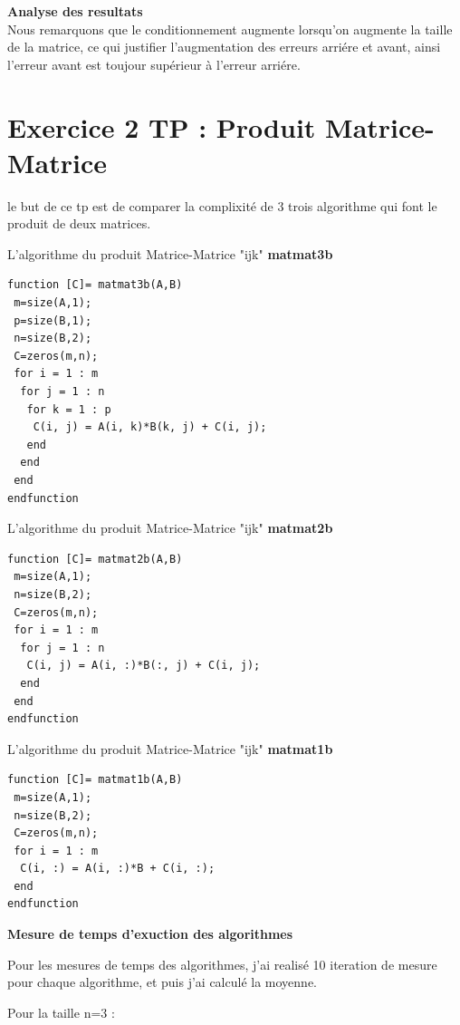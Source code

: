 \documentclass[12pt]{report}
\begin{document}
\textbf{Analyse des resultats}\\
Nous remarquons que le conditionnement augmente lorsqu'on augmente la taille de la matrice, ce qui justifier l'augmentation des erreurs arriére et avant, ainsi l'erreur avant est toujour supérieur à l'erreur arriére. 
      
\section{Exercice 2 TP : Produit Matrice-Matrice} 
le but de ce tp est de comparer la complixité de 3 trois algorithme qui font le produit de deux matrices.
         
L’algorithme du produit Matrice-Matrice "ijk" \textbf{matmat3b}
\begin{lstlisting}
function [C]= matmat3b(A,B)
 m=size(A,1);
 p=size(B,1);
 n=size(B,2);
 C=zeros(m,n);
 for i = 1 : m
  for j = 1 : n
   for k = 1 : p
    C(i, j) = A(i, k)*B(k, j) + C(i, j);
   end 
  end 
 end 
endfunction
\end{lstlisting}     

L’algorithme du produit Matrice-Matrice "ijk" \textbf{matmat2b}
\begin{lstlisting} 
function [C]= matmat2b(A,B)
 m=size(A,1);
 n=size(B,2);
 C=zeros(m,n);
 for i = 1 : m
  for j = 1 : n
   C(i, j) = A(i, :)*B(:, j) + C(i, j);
  end 
 end 
endfunction 
\end{lstlisting} 
 
L’algorithme du produit Matrice-Matrice "ijk" \textbf{matmat1b}
\begin{lstlisting} 
function [C]= matmat1b(A,B)
 m=size(A,1);
 n=size(B,2);
 C=zeros(m,n);
 for i = 1 : m
  C(i, :) = A(i, :)*B + C(i, :);
 end 
endfunction
\end{lstlisting}  

\textbf{Mesure de temps d'exuction des algorithmes}

Pour les mesures de temps des algorithmes, j'ai realisé 10 iteration de mesure pour chaque algorithme, et puis j'ai calculé la moyenne.

Pour la taille n=3 :\\
\end{document}

